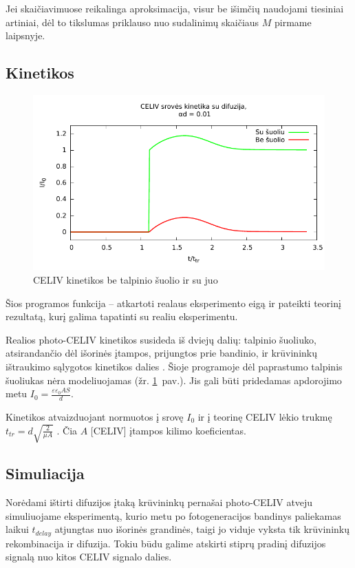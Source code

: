 Jei skaičiavimuose reikalinga aproksimacija, visur be išimčių naudojami tiesiniai artiniai, dėl to tikslumas priklauso nuo sudalinimų skaičiaus \(M\) pirmame laipsnyje.

\subsection{Kinetikos}

\begin{figure}
\centering
\includegraphics[width=\textwidth]{./media/pdf/jump.pdf} 
\caption{CELIV kinetikos be talpinio šuolio ir su juo}
\label{fig:suoliai}
\end{figure}


Šios programos funkcija -- atkartoti realaus eksperimento eigą ir pateikti teorinį rezultatą, kurį galima tapatinti su realiu eksperimentu.

Realios photo-CELIV kinetikos susideda iš dviejų dalių: talpinio šuoliuko, atsirandančio dėl išorinės įtampos, prijungtos prie bandinio, ir krūvininkų ištraukimo sąlygotos kinetikos dalies \cite{juška:4946}. Šioje programoje dėl paprastumo talpinis šuoliukas nėra modeliuojamas (žr. \ref{fig:suoliai}~pav.). Jis gali būti pridedamas apdorojimo metu \(I_0 = \frac{\varepsilon \varepsilon_0 A S}{d}\).

Kinetikos atvaizduojant normuotos į srovę \(I_0\) ir į teorinę CELIV lėkio trukmę \(t_{tr} = d \sqrt{\frac{2}{\mu A}} \) \cite{juška:155202}. Čia \(A\) [CELIV] įtampos kilimo koeficientas.

\subsection{Simuliacija}

Norėdami ištirti difuzijos įtaką krūvininkų pernašai photo-CELIV atveju simuliuojame eksperimentą, kurio metu po fotogeneracijos bandinys paliekamas laikui \(t_{delay}\) atjungtas nuo išorinės grandinės, taigi jo viduje vyksta tik krūvininkų rekombinacija ir difuzija. Tokiu būdu galime atskirti stiprų pradinį difuzijos signalą nuo kitos CELIV signalo dalies.

